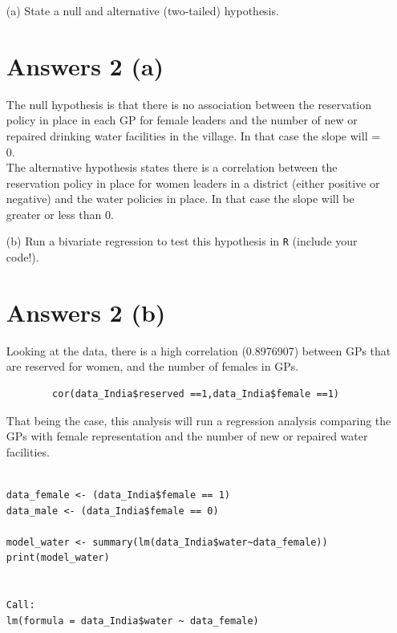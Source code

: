 \documentclass[12pt,letterpaper]{article}
\begin{document}
\newpage
\begin{enumerate}
	\item [(a)] State a null and alternative (two-tailed) hypothesis. \\
	
\section*{Answers 2 (a)}	
	
	The null hypothesis is that there is no association between the reservation policy in place in each GP for female leaders and the number of new or repaired drinking water facilities in the village. In that case the slope will = 0. \\
	
	The alternative hypothesis states there is a correlation between the reservation policy in place for women leaders in a district (either positive or negative) and the water policies in place. In that case the slope will be greater or less than 0. \\
	
	
	
	\item [(b)] Run a bivariate regression to test this hypothesis in \texttt{R} (include your code!). \\
	
	\section*{Answers 2 (b)}
	
	Looking at the data, there is a high correlation (0.8976907) between GPs that are reserved for women, and the number of females in GPs. 
	
	\begin{verbatim}
		cor(data_India$reserved ==1,data_India$female ==1)
	\end{verbatim}
	
That being the case, this analysis will  run a regression analysis comparing the GPs with female representation and the number of new or repaired water facilities.  
	
	\begin{verbatim}

data_female <- (data_India$female == 1)
data_male <- (data_India$female == 0)

model_water <- summary(lm(data_India$water~data_female))
print(model_water)


Call:
lm(formula = data_India$water ~ data_female)


\end{verbatim}
\end{enumerate}
\end{document}
